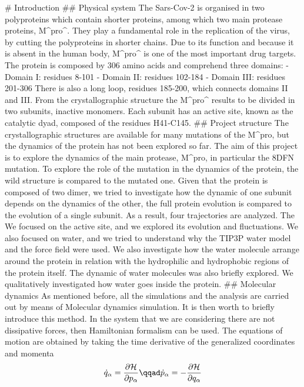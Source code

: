 # Introduction
## Physical system
The Sars-Cov-2 is organised in two polyproteins which contain shorter proteins, among which two main protease proteins, M^pro^. They play a fundamental role in the replication of the virus, by cutting the polyproteins in shorter chains. Due to its function and because it is absent in the human body, M^pro^ is one of the most important drug targets. 
The protein is composed by 306 amino acids and comprehend three domains:
- Domain I: residues 8-101
- Domain II: residues 102-184
- Domain III: residues 201-306
There is also a long loop, residues 185-200, which connects domains II and III. 
From the crystallographic structure the M^pro^ results to be divided in two subunits, inactive monomers. Each subunit has an active site, known as the catalytic dyad, composed of the residues H41-C145. 
## Project structure
The crystallographic structures are available for many mutations of the M^{pro}, but the dynamics of the protein has not been explored so far. The aim of this project is to explore the dynamics of the main protease, M^{pro}, in particular the 8DFN mutation. 
To explore the role of the mutation in the dynamics of the protein, the wild structure is compared to the mutated one. Given that the protein is composed of two dimer, we tried to investigate how the dynamic of one subunit depends on the dynamics of the other, the full protein evolution is compared to the evolution of a single subunit. As a result, four trajectories are analyzed. 
The 
We focused on the active site, and we explored its evolution and fluctuations. 
We also focused on water, and we tried to understand why the TIP3P water model and the  force field were used. We also investigate how the water molecule arrange around the protein in relation with the hydrophilic and hydrophobic regions of the protein itself. The dynamic of water molecules was also briefly explored. We qualitatively investigated how water goes inside the protein. 
## Molecular dynamics
As mentioned before, all the simulations and the analysis are carried out by means of Molecular dynamics simulation. It is then worth to briefly introduce this method. In the system that we are considering there are not dissipative forces, then Hamiltonian formalism can be used. The equations of motion are obtained by taking the time derivative of the generalized coordinates and momenta
\begin{equation}
\dot{q}_{\alpha} = \frac{\partial \mathcal{H}}{\partial p_{\alpha}} \qqad \dot{p}_{\alpha} =- \frac{\partial \mathcal{H}}{\partial q_{\alpha}}
\end{equation}
